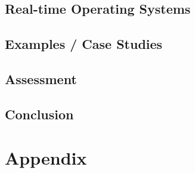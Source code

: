 \documentclass[10pt,a4paper,titlepage,draft]{report} %
\begin{document}
\section{Real-time Operating Systems}

\section{Examples / Case Studies}


\section{Assessment}

\section{Conclusion}




\chapter*{Appendix}
\end{document}
